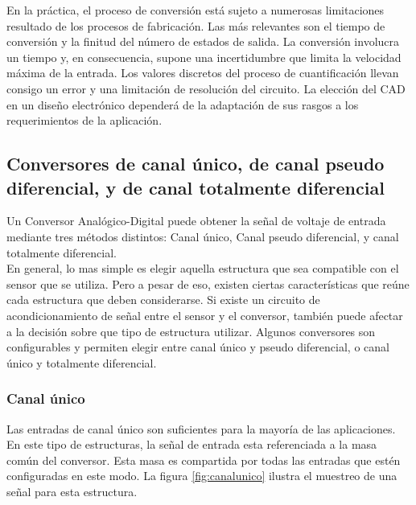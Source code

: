En la práctica, el proceso de conversión está sujeto a numerosas limitaciones resultado de los procesos de fabricación. Las más relevantes son el tiempo de conversión y la finitud del número de estados de salida. La conversión involucra un tiempo y, en consecuencia, supone  una  incertidumbre  que  limita  la  velocidad  máxima  de  la  entrada.  Los  valores discretos  del  proceso  de  cuantificación  llevan  consigo  un  error  y  una  limitación  de resolución del circuito. La elección del CAD en un diseño electrónico dependerá de la adaptación de sus rasgos a  los requerimientos de la aplicación. \cite{adc}




\subsection{Conversores de canal único, de canal pseudo diferencial, y de canal totalmente diferencial}
\label{sub:conversores_de_canal_unico_de_canal_pseudo_balanceado_y_de_canal_totalmente_balanceado}

Un Conversor Analógico-Digital puede obtener la señal de voltaje de entrada mediante tres métodos distintos: Canal único, Canal pseudo diferencial, y canal totalmente diferencial. \\

En general, lo mas simple es elegir aquella estructura que sea compatible con el sensor que se utiliza. Pero a pesar de eso, existen ciertas características que reúne cada estructura que deben considerarse. Si existe un circuito de acondicionamiento de señal entre el sensor y el conversor, también puede afectar a la decisión sobre que tipo de estructura utilizar. Algunos conversores son configurables y permiten elegir entre canal único y pseudo diferencial, o canal único y totalmente diferencial.\cite{tipos_canales}

\subsubsection{Canal único}
\label{subs:canal_unico}

Las entradas de canal único son suficientes para la mayoría de las aplicaciones. En este tipo de estructuras, la señal de entrada esta referenciada a la masa común del conversor. Esta masa es compartida por todas las entradas que estén configuradas en este modo. La figura \ref{fig:canalunico} ilustra el muestreo de una señal para esta estructura.

